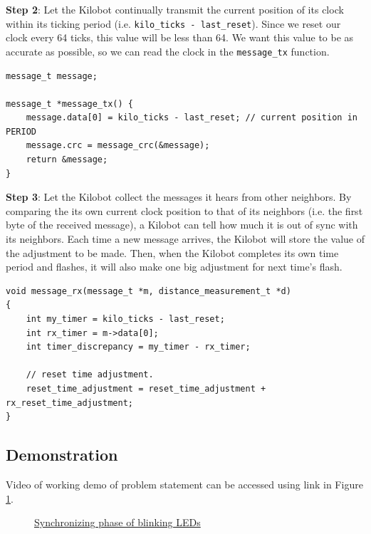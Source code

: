 \documentclass{report}[12pt]
\begin{document}
\noindent \textbf{Step  2}: Let the Kilobot continually transmit the current position of its clock within its ticking period (i.e. \texttt{kilo\_ticks - last\_reset}). Since we reset our clock every 64 ticks, this value will be less than 64. We want this value to be as accurate as possible, so we can read the clock in the \texttt{message\_tx} function. 
\begin{verbatim}
message_t message;

message_t *message_tx() {
    message.data[0] = kilo_ticks - last_reset; // current position in PERIOD
    message.crc = message_crc(&message);
    return &message;
}
\end{verbatim}

\noindent \textbf{Step 3}: Let the Kilobot collect the messages it hears from other neighbors. 
By comparing the its own current clock position to that of its neighbors (i.e. the first byte of the received message), a Kilobot can tell how much it is out of sync with its neighbors. Each time a new message arrives, the Kilobot will store the value of the adjustment to be made. Then, when the Kilobot completes its own time period and flashes, it will also make one big adjustment for next time's flash.

\begin{verbatim}
void message_rx(message_t *m, distance_measurement_t *d)
{
    int my_timer = kilo_ticks - last_reset;
    int rx_timer = m->data[0];
    int timer_discrepancy = my_timer - rx_timer;
    
    // reset time adjustment.
    reset_time_adjustment = reset_time_adjustment + 	rx_reset_time_adjustment;
}
\end{verbatim}

\subsection{Demonstration}
Video of working demo of problem statement can be accessed using link in Figure \ref{fig:sync_lights}.
\begin{figure}[H]
	\centering
	\caption{\href{https://photos.app.goo.gl/nvWXb5ziksYnx73s6}{Synchronizing phase of blinking LEDs}}
	\label{fig:sync_lights}
\end{figure}

{}

\end{document}
